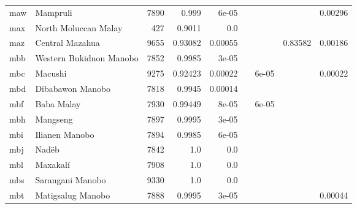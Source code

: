 \documentclass[11pt]{article}
\begin{document}
\begin{table*}[h]
{\begin{tabular}{llrrrrrrr}
maw         & Mampruli         & 7890         & 0.999         & 6e-05         &          &          &          & 0.00296         \\

max         & North Moluccan Malay         & 427         & 0.9011         & 0.0         &          &          &          &          \\

maz         & Central Mazahua         & 9655         & 0.93082         & 0.00055         &          &          & 0.83582         & 0.00186         \\

mbb         & Western Bukidnon Manobo         & 7852         & 0.9985         & 3e-05         &          &          &          &          \\

mbc         & Macushi         & 9275         & 0.92423         & 0.00022         &          & 6e-05         &          & 0.00022         \\

mbd         & Dibabawon Manobo         & 7818         & 0.9945         & 0.00014         &          &          &          &          \\

mbf         & Baba Malay         & 7930         & 0.99449         & 8e-05         &          & 6e-05         &          &          \\

mbh         & Mangseng         & 7897         & 0.9995         & 3e-05         &          &          &          &          \\

mbi         & Ilianen Manobo         & 7894         & 0.9985         & 6e-05         &          &          &          &          \\

mbj         & Nadëb         & 7842         & 1.0         & 0.0         &          &          &          &          \\

mbl         & Maxakalí         & 7908         & 1.0         & 0.0         &          &          &          &          \\

mbs         & Sarangani Manobo         & 9330         & 1.0         & 0.0         &          &          &          &          \\

mbt         & Matigsalug Manobo         & 7888         & 0.9995         & 3e-05         &          &          &          & 0.00044         \\


\end{tabular}}
\end{table*}
\end{document}
